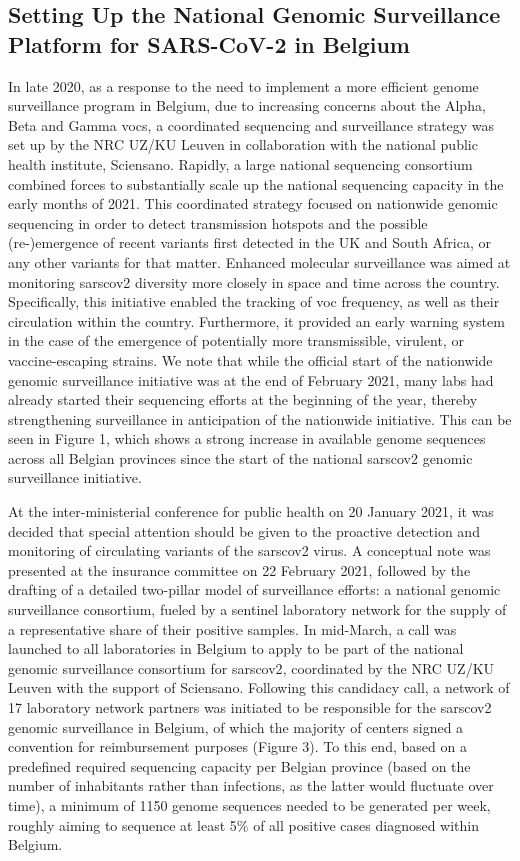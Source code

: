 \subsection{Setting Up the National Genomic Surveillance Platform for SARS-CoV-2 in Belgium}
In late 2020, as a response to the need to implement a more efficient genome surveillance program in Belgium, due to increasing concerns about the Alpha, Beta and Gamma \gls{voc}s, a coordinated sequencing and surveillance strategy was set up by the NRC UZ/KU Leuven in collaboration with the national public health institute, Sciensano.
Rapidly, a large national sequencing consortium combined forces to substantially scale up the national sequencing capacity in the early months of 2021.
This coordinated strategy focused on nationwide genomic sequencing in order to detect transmission hotspots and the possible (re-)emergence of recent variants first detected in the UK and South Africa, or any other variants for that matter.
Enhanced molecular surveillance was aimed at monitoring \gls{sarscov2} diversity more closely in space and time across the country.
Specifically, this initiative enabled the tracking of \gls{voc} frequency, as well as their circulation within the country.
Furthermore, it provided an early warning system in the case of the emergence of potentially more transmissible, virulent, or vaccine-escaping strains.
We note that while the official start of the nationwide genomic surveillance initiative was at the end of February 2021, many labs had already started their sequencing efforts at the beginning of the year, thereby strengthening surveillance in anticipation of the nationwide initiative.
This can be seen in Figure 1, which shows a strong increase in available genome sequences across all Belgian provinces since the start of the national \gls{sarscov2} genomic surveillance initiative.

At the inter-ministerial conference for public health on 20 January 2021, it was decided that special attention should be given to the proactive detection and monitoring of circulating variants of the \gls{sarscov2} virus.
A conceptual note was presented at the insurance committee on 22 February 2021, followed by the drafting of a detailed two-pillar model of surveillance efforts: a national genomic surveillance consortium, fueled by a sentinel laboratory network for the supply of a representative share of their positive samples.
In mid-March, a call was launched to all laboratories in Belgium to apply to be part of the national genomic surveillance consortium for \gls{sarscov2}, coordinated by the NRC UZ/KU Leuven with the support of Sciensano.
Following this candidacy call, a network of 17 laboratory network partners was initiated to be responsible for the \gls{sarscov2} genomic surveillance in Belgium, of which the majority of centers signed a convention for reimbursement purposes (Figure 3).
To this end, based on a predefined required sequencing capacity per Belgian province (based on the number of inhabitants rather than infections, as the latter would fluctuate over time), a minimum of 1150 genome sequences needed to be generated per week, roughly aiming to sequence at least 5\% of all positive cases diagnosed within Belgium.


